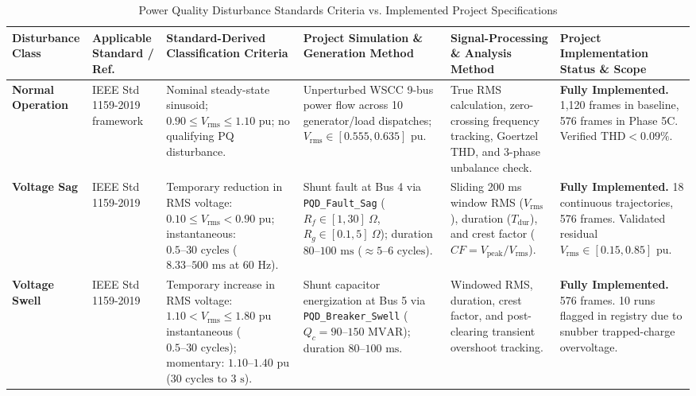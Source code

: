 \documentclass[12pt,a4paper]{report}
\begin{document}
\begin{table}[H]
\centering
\caption{Power Quality Disturbance Standards Criteria vs. Implemented Project Specifications}
\label{tab:classification_matrix}
\tiny
\setlength{\tabcolsep}{3pt}
\renewcommand{\arraystretch}{1.2}
\begin{tabularx}{\textwidth}{p{1.7cm}p{1.6cm}p{2.5cm}p{2.7cm}p{2.7cm}p{2.4cm}}
\toprule
\textbf{Disturbance Class} & \textbf{Applicable Standard / Ref.} & \textbf{Standard-Derived Classification Criteria} & \textbf{Project Simulation \& Generation Method} & \textbf{Signal-Processing \& Analysis Method} & \textbf{Project Implementation Status \& Scope} \\
\midrule
\textbf{Normal Operation} & IEEE Std 1159-2019 framework & Nominal steady-state sinusoid; $0.90 \le V_{\text{rms}} \le 1.10\text{ pu}$; no qualifying PQ disturbance. & Unperturbed WSCC 9-bus power flow across 10 generator/load dispatches; $V_{\text{rms}} \in [0.555, 0.635]\text{ pu}$. & True RMS calculation, zero-crossing frequency tracking, Goertzel THD, and 3-phase unbalance check. & \textbf{Fully Implemented.} 1,120 frames in baseline, 576 frames in Phase 5C. Verified $\text{THD} < 0.09\%$. \\
\addlinespace
\textbf{Voltage Sag} & IEEE Std 1159-2019 & Temporary reduction in RMS voltage: $0.10 \le V_{\text{rms}} < 0.90\text{ pu}$; instantaneous: $0.5\text{--}30\text{ cycles}$ ($8.33\text{--}500\text{ ms}$ at 60 Hz). & Shunt fault at Bus 4 via \texttt{PQD\_Fault\_Sag} ($R_f \in [1, 30]\ \Omega$, $R_g \in [0.1, 5]\ \Omega$); duration $80\text{--}100\text{ ms}$ ($\approx 5\text{--}6\text{ cycles}$). & Sliding 200 ms window RMS ($V_{\text{rms}}$), duration ($T_{\text{dur}}$), and crest factor ($CF = V_{\text{peak}} / V_{\text{rms}}$). & \textbf{Fully Implemented.} 18 continuous trajectories, 576 frames. Validated residual $V_{\text{rms}} \in [0.15, 0.85]\text{ pu}$. \\
\addlinespace
\textbf{Voltage Swell} & IEEE Std 1159-2019 & Temporary increase in RMS voltage: $1.10 < V_{\text{rms}} \le 1.80\text{ pu}$ instantaneous ($0.5\text{--}30\text{ cycles}$); momentary: $1.10\text{--}1.40\text{ pu}$ ($30\text{ cycles to }3\text{ s}$). & Shunt capacitor energization at Bus 5 via \texttt{PQD\_Breaker\_Swell} ($Q_c = 90\text{--}150\text{ MVAR}$); duration $80\text{--}100\text{ ms}$. & Windowed RMS, duration, crest factor, and post-clearing transient overshoot tracking. & \textbf{Fully Implemented.} 576 frames. 10 runs flagged in registry due to snubber trapped-charge overvoltage. \\

\end{tabularx}
\end{table}
\end{document}
